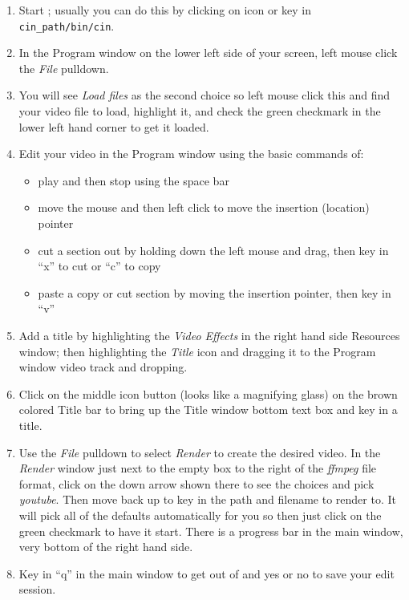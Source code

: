 \begin{enumerate}
	\item Start \CGG{}; usually you can do this by clicking on \CGG{} icon or key in \texttt{{cin\_path}/bin/cin}.
	\item In the Program window on the lower left side of your screen, left mouse click the \textit{File} pulldown.
	\item You will see \textit{Load files} as the second choice so left mouse click this and find your video file to
	load, highlight it, and check the green checkmark in the lower left hand corner to get it loaded.
	\item Edit your video in the Program window using the basic commands of:
	\begin{itemize}
		\item play and then stop using the space bar
		\item move the mouse and then left click to move the insertion (location) pointer
		\item cut a section out by holding down the left mouse and drag, then key in “x” to cut or “c” to copy
		\item paste a copy or cut section by moving the insertion pointer, then key in “v”
	\end{itemize}
	\item Add a title by highlighting the \textit{Video Effects} in the right hand side Resources window; then
	highlighting the \textit{Title} icon and dragging it to the Program window video track and dropping.
	\item Click on the middle icon button (looks like a magnifying glass) on the brown colored Title bar to
	bring up the Title window bottom text box and key in a title.
	\item Use the \textit{File} pulldown to select \textit{Render} to create the desired video.  In the \textit{Render} window just next to the empty box to the right of the \textit{ffmpeg} file format, click on the down arrow shown there
	to see the choices and pick \textit{youtube}.  Then move back up to key in the path and filename to render
	to.  It will pick all of the defaults automatically for you so then just click on the green checkmark to
	have it start.  There is a progress bar in the main window, very bottom of the right hand side.
	\item Key in “q” in the main window to get out of \CGG{} and yes or no to save your edit session.
\end{enumerate}

